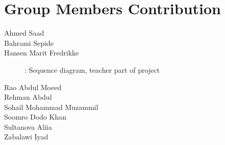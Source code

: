 \section{Group Members Contribution}


\begin{description}
	\item[Ahmed Saad] 
	\item[Bahrami Sepide]
	\item[Hansen Marit Fredrikke]: Sequence diagram, teacher part of project
	\item[Rao Abdul Moeed] 
	\item[Rehman Abdul] 
	\item[Sohail Mohammad Muzammil] 
	\item[Soomro Dodo Khan] 
	\item[Sultanova Aliia] 
	\item[Zabalawi Iyad] 
\end{description}
